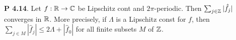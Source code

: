 {\bf P 4.14}. Let $f: \mathbb{R} \rightarrow \mathbb{C}$ be Lipschitz cont and $2\pi$-periodic. Then $\sum_{j\in\mathbb{Z}}|\hat{f}_j|$ converges in $\mathbb{R}$. More precisely, if $\Lambda$ is a Lipschitz const for $f$, then $\sum_{j\in M}|\hat{f}_j| \leq 2 \Lambda + |\hat{f}_0|$ for all finite subsets $M$ of $\mathbb{Z}$. 
